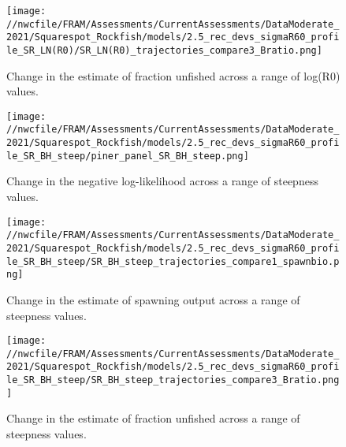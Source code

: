 \documentclass[11pt,
  english,
  a4paper,
]{article}
\begin{document}
\tagmcend\tagstructend


\begin{figure}
\centering
\texttt{[image: //nwcfile/FRAM/Assessments/CurrentAssessments/DataModerate\_2021/Squarespot\_Rockfish/models/2.5\_rec\_devs\_sigmaR60\_profile\_SR\_LN(R0)/SR\_LN(R0)\_trajectories\_compare3\_Bratio.png]}
\caption{Change in the estimate of fraction unfished across a range of log(R0) values.\label{fig:r0-depl}}
\end{figure}

\tagmcend\tagstructend


\begin{figure}
\centering
\texttt{[image: //nwcfile/FRAM/Assessments/CurrentAssessments/DataModerate\_2021/Squarespot\_Rockfish/models/2.5\_rec\_devs\_sigmaR60\_profile\_SR\_BH\_steep/piner\_panel\_SR\_BH\_steep.png]}
\caption{Change in the negative log-likelihood across a range of steepness values.\label{fig:h-profile}}
\end{figure}

\tagmcend\tagstructend


\begin{figure}
\centering
\texttt{[image: //nwcfile/FRAM/Assessments/CurrentAssessments/DataModerate\_2021/Squarespot\_Rockfish/models/2.5\_rec\_devs\_sigmaR60\_profile\_SR\_BH\_steep/SR\_BH\_steep\_trajectories\_compare1\_spawnbio.png]}
\caption{Change in the estimate of spawning output across a range of steepness values.\label{fig:h-ssb}}
\end{figure}

\tagmcend\tagstructend


\begin{figure}
\centering
\texttt{[image: //nwcfile/FRAM/Assessments/CurrentAssessments/DataModerate\_2021/Squarespot\_Rockfish/models/2.5\_rec\_devs\_sigmaR60\_profile\_SR\_BH\_steep/SR\_BH\_steep\_trajectories\_compare3\_Bratio.png]}
\caption{Change in the estimate of fraction unfished across a range of steepness values.\label{fig:h-depl}}
\end{figure}
\end{document}

